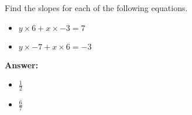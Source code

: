  Find the slopes for each of the following equations. \begin{itemize}\item \( y \times 6 + x \times -3 = 7 \)\item \( y \times -7 + x \times 6 = -3 \)\end{itemize}

        \textbf{Answer:} \begin{itemize}\item \( \frac{1}{2} \)\item \( \frac{6}{7} \)\end{itemize}
